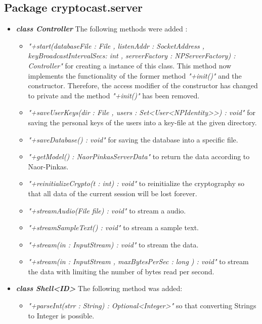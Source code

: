 \documentclass[a4paper,10pt]{scrartcl}
\begin{document}
\subsection{Package cryptocast.server}

\begin{itemize}
  
	\item \textbf{\textit{class Controller}} \newline
	The following methods were added :
	\begin{itemize}
	 \item \textit{"+start(databaseFile : File , listenAddr : SocketAddress , keyBroadcastIntervalSecs: int ,
	 serverFactory : NPServerFactory) : Controller"} for creating a instance of this class. This method now 
	 implements the functionality of the former method \textit{"+init()"}  and 
	the constructor. Therefore, the access modifier of the constructor has changed to private and the method  
	\textit{"+init()"} has been removed.
	 \item \textit{"+saveUserKeys(dir : File , users : Set<User<NPIdentity>>) : void"} for saving
	 the personal keys of the users into a key-file at the given directory.
	 \item \textit{"+saveDatabase() : void"} for saving the database into a specific file.
	 \item \textit{"+getModel() : NaorPinkasServerData"} to return the data according to Naor-Pinkas.
	 \item \textit{"+reinitializeCrypto(t : int) : void"} to reinitialize the cryptography so that 
	 all data of the current session will be lost forever.
	 \item \textit{"+streamAudio(File file) : void"} to stream a audio.
	 \item \textit{"+streamSampleText() : void"} to stream a sample text.
	 \item \textit{"+stream(in : InputStream) : void"} to stream the data.
	 \item \textit{"+stream(in : InputStream , maxBytesPerSec : long ) : void"} to stream the data with limiting 
	 the number of bytes read per second.
	\end{itemize}
	
	\item \textbf{\textit{class Shell<ID>}}\newline
	The following method was added:
\begin{itemize}
	 \item \textit{"+parseInt(strr : String) : Optional<Integer>"} so that converting Strings to Integer is possible.
\end{itemize}
	

\end{itemize}
\end{document}
